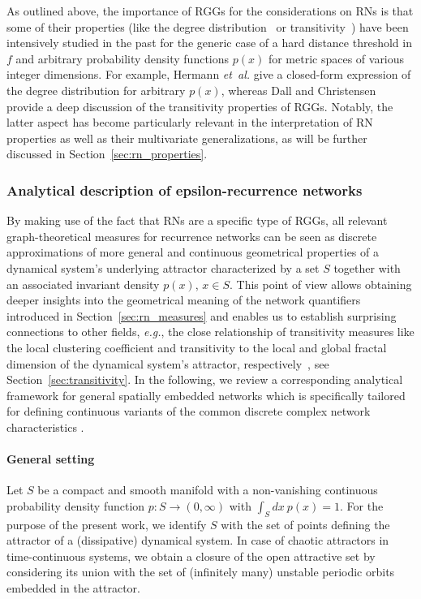 As outlined above, the importance of RGGs for the considerations on RNs is that some of their properties (like the degree distribution~\cite{Herrmann2003} or transitivity~\cite{Dall2002}) have been intensively studied in the past for the generic case of a hard distance threshold in $f$ and arbitrary probability density functions $p(x)$ for metric spaces of various integer dimensions. For example, Hermann \textit{et~al.} \cite{Herrmann2003} give a closed-form expression of the degree distribution for arbitrary $p(x)$, whereas Dall and Christensen~\cite{Dall2002} provide a deep discussion of the transitivity properties of RGGs. Notably, the latter aspect has become particularly relevant in the interpretation of RN properties as well as their multivariate generalizations, as will be further discussed in Section~\ref{sec:rn_properties}.


\subsubsection{Analytical description of epsilon-recurrence networks}

By making use of the fact that RNs are a specific type of RGGs, all relevant graph-theoretical measures for recurrence networks can be seen as discrete approximations of more general and continuous geometrical properties of a dynamical system's underlying attractor characterized by a set $S$ together with an associated invariant density $p(x)$, $x\in S$. This point of view allows obtaining deeper insights into the geometrical meaning of the network quantifiers introduced in Section~\ref{sec:rn_measures} and enables us to establish surprising connections to other fields, \textit{e.g.}, the close relationship of transitivity measures like the local clustering coefficient and transitivity to the local and global fractal dimension of the dynamical system's attractor, respectively~\cite{Donner2011EPJB}, see Section~\ref{sec:transitivity}. In the following, we review a corresponding analytical framework for general spatially embedded networks which is specifically tailored for defining continuous variants of the common discrete complex network characteristics \cite{Donges2012PRE}.


\paragraph{General setting}

Let $S$ be a compact and smooth manifold with a non-vanishing continuous probability density function $p:S\to(0,\infty)$ with $\int_S dx\ p(x) = 1$. For the purpose of the present work, we identify $S$ with the set of points defining the attractor of a (dissipative) dynamical system. In case of chaotic attractors in time-continuous systems, we obtain a closure of the open attractive set by considering its union with the set of (infinitely many) unstable periodic orbits embedded in the attractor.

